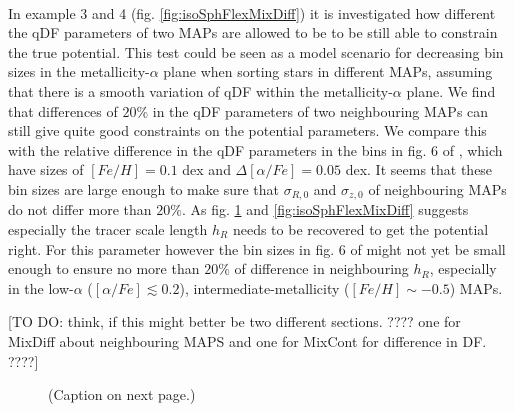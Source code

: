 \documentclass[12pt,preprint]{aastex}
\begin{document}
\\In example 3 and 4 (fig. \ref{fig:isoSphFlexMixDiff}) it is investigated how different the qDF parameters of two MAPs are allowed to be to be still able to constrain the true potential. This test could be seen as a model scenario for decreasing bin sizes in the metallicity-$\alpha$ plane when sorting stars in different MAPs, assuming that there is a smooth variation of qDF within the metallicity-$\alpha$ plane. We find that differences of $20\%$ in the qDF parameters of two neighbouring MAPs can still give quite good constraints on the potential parameters. We compare this with the relative difference in the qDF parameters in the bins in fig. 6 of \cite{bov13}, which have sizes of $[Fe/H] = 0.1$ dex and $\Delta [\alpha/Fe] = 0.05$ dex. It seems that these bin sizes are large enough to make sure that $\sigma_{R,0}$ and $\sigma_{z,0}$ of neighbouring MAPs do not differ more than $20\%$. As fig. \ref{fig:isoSphFlexMixCont} and \ref{fig:isoSphFlexMixDiff} suggests especially the tracer scale length $h_R$ needs to be recovered to get the potential right. For this parameter however the bin sizes in fig. 6 of \cite{bov13} might not yet be small enough to ensure no more than $20\%$ of difference in neighbouring $h_R$, especially in the low-$\alpha$ ($[\alpha/Fe] \lesssim 0.2$), intermediate-metallicity ($[Fe/H] \sim -0.5$) MAPs.

[TO DO: think, if this might better be two different sections. ???? one for MixDiff about neighbouring MAPS and one for MixCont for difference in DF. ????]



\begin{figure}
\caption{(Caption on next page.)}
\label{fig:isoSphFlexMixCont}
\end{figure}
\end{document}
